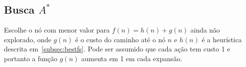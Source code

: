 \subsection{Busca $A^*$}
\label{subsec:astar}
Escolhe o nó com menor valor para $f( n ) = h( n ) + g( n )$ ainda não explorado, onde $g( n )$ é o custo do caminho até o nó $n$ e $h( n )$ é a heurística descrita em~\ref{subsec:bestfs}. Pode ser assumido que cada ação tem custo 1 e portanto a função $g( n )$ aumenta em 1 em cada expansão.